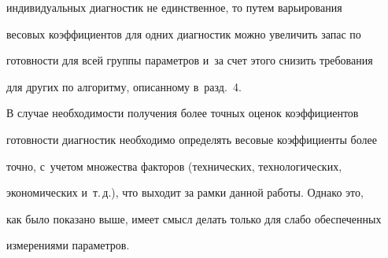 индивидуальных диагностик не единственное, то путем варьирования 


весовых коэффициентов для одних диагностик мож\-но увеличить запас по 


готовности для всей группы па\-ра\-мет\-ров и~за счет этого снизить требования 


для других по алгоритму, описанному в~разд.~4.








В случае необходимости получения более точных оценок коэффициентов 


готовности диагностик необходимо определять весовые коэффициенты более 


точно, с~учетом множества факторов (технических, технологических, 


экономических и~т.\,д.), что выходит за рамки данной работы. Однако это, 


как было показано выше, имеет смысл делать только для слабо обеспеченных 


измерениями па\-ра\-мет\-ров. 





